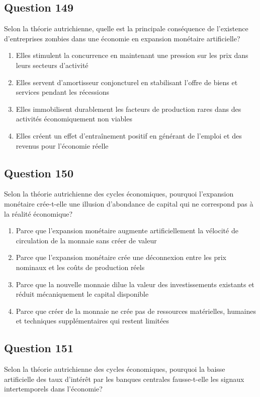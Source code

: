 \documentclass[12pt,a4paper]{article}
\begin{document}
\subsection*{Question 149}
Selon la théorie autrichienne, quelle est la principale conséquence de l'existence d'entreprises zombies dans une économie en expansion monétaire artificielle?

\begin{enumerate}[label=\Alph*., leftmargin=*]
\item Elles stimulent la concurrence en maintenant une pression sur les prix dans leurs secteurs d'activité
\item Elles servent d'amortisseur conjoncturel en stabilisant l'offre de biens et services pendant les récessions
\item Elles immobilisent durablement les facteurs de production rares dans des activités économiquement non viables
\item Elles créent un effet d'entraînement positif en générant de l'emploi et des revenus pour l'économie réelle
\end{enumerate}

\bigskip


\subsection*{Question 150}
Selon la théorie autrichienne des cycles économiques, pourquoi l'expansion monétaire crée-t-elle une illusion d'abondance de capital qui ne correspond pas à la réalité économique?

\begin{enumerate}[label=\Alph*., leftmargin=*]
\item Parce que l'expansion monétaire augmente artificiellement la vélocité de circulation de la monnaie sans créer de valeur
\item Parce que l'expansion monétaire crée une déconnexion entre les prix nominaux et les coûts de production réels
\item Parce que la nouvelle monnaie dilue la valeur des investissements existants et réduit mécaniquement le capital disponible
\item Parce que créer de la monnaie ne crée pas de ressources matérielles, humaines et techniques supplémentaires qui restent limitées
\end{enumerate}

\bigskip


\subsection*{Question 151}
Selon la théorie autrichienne des cycles économiques, pourquoi la baisse artificielle des taux d'intérêt par les banques centrales fausse-t-elle les signaux intertemporels dans l'économie?
\end{document}

